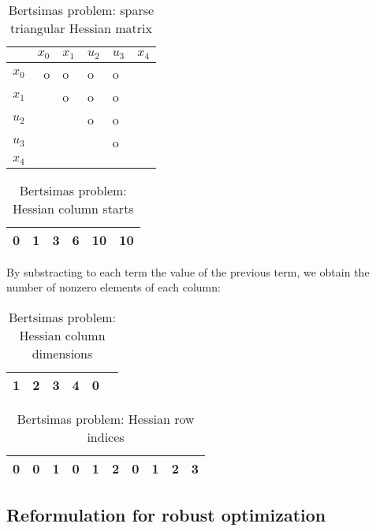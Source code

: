\documentclass[11pt,twoside]{book}
\begin{document}
\begin{table}[htbp]
	\centering
	\begin{tabular}{c|R|G|B|Y|K|}
	& $x_0$ & $x_1$ & $u_2$ & $u_3$ & $x_4$ \\
	\hline
	$x_0$ & o	& o & o & o & \\
	$x_1$ &  	& o	& o	& o	& \\
	$u_2$ &  	& 	& o	& o	& \\
	$u_3$ &  	& 	& 	& o	& \\
	$x_4$ &  	& 	& 	& 	& \\
	\hline
	\end{tabular}
	\caption{Bertsimas problem: sparse triangular Hessian matrix}
\end{table}

\begin{table}[htbp]
	\centering
	\begin{tabular}{|c|c|c|c|c|c|}
	\hline
	0 & 1 & 3 & 6 & 10 & 10 \\
	\hline
	\end{tabular}
	\caption{Bertsimas problem: Hessian column starts}
\end{table}

By substracting to each term the value of the previous term, we obtain the number of nonzero elements of each column:

\begin{table}[htbp]
	\centering
	\begin{tabular}{|c|c|c|c|c|c|}
	\hline
	\cellcolor{red!20}1 &
	\cellcolor{green!20}2 &
	\cellcolor{blue!20}3 &
	\cellcolor{yellow!20}4 &
	\cellcolor{black!20}0 \\
	\hline
	\end{tabular}
	\caption{Bertsimas problem: Hessian column dimensions}
\end{table}

\begin{table}[htbp]
	\centering
	\begin{tabular}{|c|c|c|c|c|c|c|c|c|c|}
	\hline
	\cellcolor{red!20}0 &
	\cellcolor{green!20}0 & \cellcolor{green!20}1 &
	\cellcolor{blue!20}0 & \cellcolor{blue!20}1 & \cellcolor{blue!20}2 &
	\cellcolor{yellow!20}0 & \cellcolor{yellow!20}1 & \cellcolor{yellow!20}2 & \cellcolor{yellow!20}3 \\
	\hline
	\end{tabular}
	\caption{Bertsimas problem: Hessian row indices}
\end{table}

\subsection{Reformulation for robust optimization}
\end{document}
